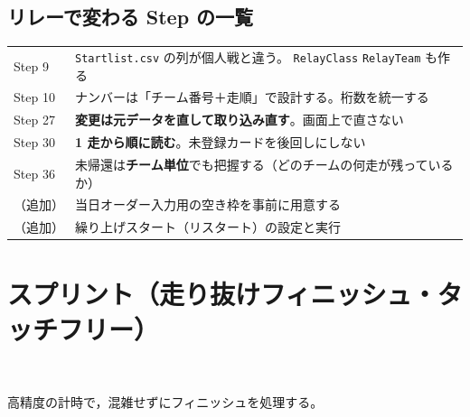 \subsection*{リレーで変わる Step の一覧}

\begin{center}
\small
\begin{tabular}{@{}P{22mm}P{122mm}@{}}
\toprule
{} &  \\
\midrule
Step 9 & \texttt{Startlist.csv} の列が個人戦と違う。
  \texttt{RelayClass} \texttt{RelayTeam} も作る \\
Step 10 & ナンバーは「チーム番号＋走順」で設計する。桁数を統一する \\
Step 27 & \textbf{変更は元データを直して取り込み直す}。画面上で直さない \\
Step 30 & \textbf{1 走から順に読む}。未登録カードを後回しにしない \\
Step 36 & 未帰還は\textbf{チーム単位}でも把握する（どのチームの何走が残っているか） \\
（追加） & 当日オーダー入力用の空き枠を事前に用意する \\
（追加） & 繰り上げスタート（リスタート）の設定と実行 \\
\bottomrule
\end{tabular}
\end{center}

\section{スプリント（走り抜けフィニッシュ・タッチフリー）}
\tSIAC\ \tSI

\begin{GoalC}
高精度の計時で，混雑せずにフィニッシュを処理する。
\end{GoalC}

